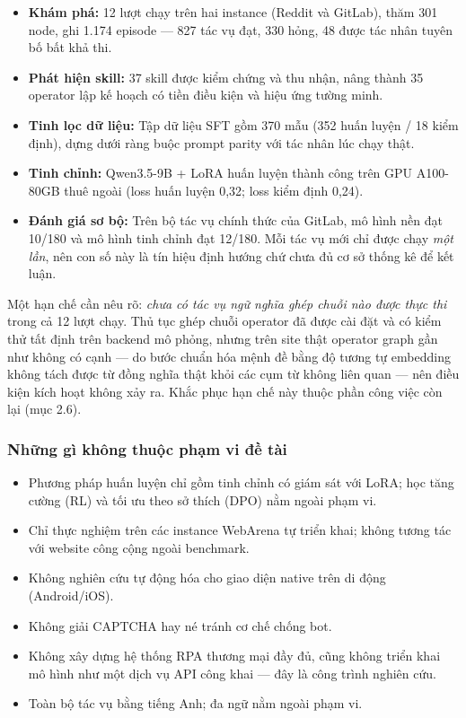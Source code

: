 \documentclass[14pt]{article}
\begin{document}
\begin{itemize}[leftmargin=1.5cm, label=\textbullet]
    \item \textbf{Khám phá:} 12 lượt chạy trên hai instance (Reddit và GitLab), thăm 301 node, ghi 1.174 episode --- 827 tác vụ đạt, 330 hỏng, 48 được tác nhân tuyên bố bất khả thi.
    \item \textbf{Phát hiện skill:} 37 skill được kiểm chứng và thu nhận, nâng thành 35 operator lập kế hoạch có tiền điều kiện và hiệu ứng tường minh.
    \item \textbf{Tinh lọc dữ liệu:} Tập dữ liệu SFT gồm 370 mẫu (352 huấn luyện / 18 kiểm định), dựng dưới ràng buộc prompt parity với tác nhân lúc chạy thật.
    \item \textbf{Tinh chỉnh:} Qwen3.5-9B + LoRA huấn luyện thành công trên GPU A100-80GB thuê ngoài (loss huấn luyện 0,32; loss kiểm định 0,24).
    \item \textbf{Đánh giá sơ bộ:} Trên bộ tác vụ chính thức của GitLab, mô hình nền đạt 10/180 và mô hình tinh chỉnh đạt 12/180. Mỗi tác vụ mới chỉ được chạy \textit{một lần}, nên con số này là tín hiệu định hướng chứ chưa đủ cơ sở thống kê để kết luận.
\end{itemize}

Một hạn chế cần nêu rõ: \textit{chưa có tác vụ ngữ nghĩa ghép chuỗi nào được thực thi} trong cả 12 lượt chạy. Thủ tục ghép chuỗi operator đã được cài đặt và có kiểm thử tất định trên backend mô phỏng, nhưng trên site thật operator graph gần như không có cạnh --- do bước chuẩn hóa mệnh đề bằng độ tương tự embedding không tách được từ đồng nghĩa thật khỏi các cụm từ không liên quan --- nên điều kiện kích hoạt không xảy ra. Khắc phục hạn chế này thuộc phần công việc còn lại (mục 2.6).

\subsubsection{Những gì không thuộc phạm vi đề tài}

\begin{itemize}[leftmargin=1.5cm, label=\textbullet]
    \item Phương pháp huấn luyện chỉ gồm tinh chỉnh có giám sát với LoRA; học tăng cường (RL) và tối ưu theo sở thích (DPO) nằm ngoài phạm vi.
    \item Chỉ thực nghiệm trên các instance WebArena tự triển khai; không tương tác với website công cộng ngoài benchmark.
    \item Không nghiên cứu tự động hóa cho giao diện native trên di động (Android/iOS).
    \item Không giải CAPTCHA hay né tránh cơ chế chống bot.
    \item Không xây dựng hệ thống RPA thương mại đầy đủ, cũng không triển khai mô hình như một dịch vụ API công khai --- đây là công trình nghiên cứu.
    \item Toàn bộ tác vụ bằng tiếng Anh; đa ngữ nằm ngoài phạm vi.
\end{itemize}
\end{document}
